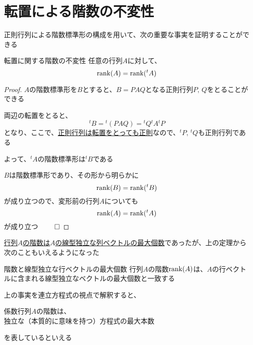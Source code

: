 \documentclass[../../../topic_linear-algebra]{subfiles}
\begin{document}
\sectionline
\section{転置による階数の不変性}

正則行列による階数標準形の構成を用いて、次の重要な事実を証明することができる

\begin{theorem}{転置に関する階数の不変性}
  任意の行列$A$に対して、
  \begin{equation*}
    \rank(A) = \rank({}^t A)
  \end{equation*}
\end{theorem}

\begin{proof}
  $A$の階数標準形を$B$とすると、$B=PAQ$となる正則行列$P,\,Q$をとることができる

  両辺の転置をとると、
  \begin{equation*}
    {}^t B = {}^t (PAQ) = {}^t Q {}^t A {}^t P
  \end{equation*}
  となり、ここで、\hyperref[thm:transpose-of-invertible]{正則行列は転置をとっても正則}なので、${}^t P,\,{}^t Q$も正則行列である

  よって、${}^tA$の階数標準形は${}^t B$である

  \br

  $B$は階数標準形であり、その形から明らかに
  \begin{equation*}
    \rank(B) = \rank({}^t B)
  \end{equation*}
  が成り立つので、変形前の行列$A$についても
  \begin{equation*}
    \rank(A) = \rank({}^t A)
  \end{equation*}
  が成り立つ $\qed$
\end{proof}

\br

\hyperref[thm:rank-equals-max-indep-cols]{行列$A$の階数は$A$の線型独立な列ベクトルの最大個数}であったが、上の定理から次のこともいえるようになった

\begin{theorem}{階数と線型独立な行ベクトルの最大個数}
  行列$A$の階数$\rank(A)$は、$A$の行ベクトルに含まれる線型独立なベクトルの最大個数と一致する
\end{theorem}

\br

上の事実を連立方程式の視点で解釈すると、
\begin{shaded}
  係数行列$A$の階数は、\\
  独立な（本質的に意味を持つ）方程式の最大本数
\end{shaded}
を表しているといえる
\end{document}
